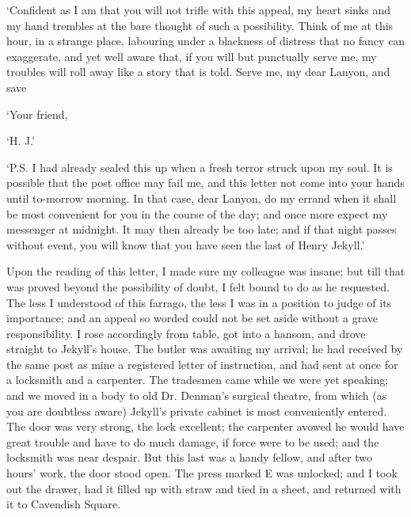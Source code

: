 \documentclass[]{novel}
\begin{document}
\begin{parascale}[0.9]
‘Confident as I am that you will not trifle with this appeal, my heart sinks and my hand trembles at the bare thought of such a possibility. Think of me at this hour, in a strange place, labouring under a blackness of distress that no fancy can exaggerate, and yet well aware that, if you will but punctually serve me, my troubles will roll away like a story that is told. Serve me, my dear Lanyon, and save

\stake\hfill‘Your friend,\hspace{1.5em}

\stake\hfill\textsc{‘H. J.’}\par\null

‘P.S. I had already sealed this up when a fresh terror struck upon my soul. It is possible that the post office may fail me, and this letter not come into your hands until to-morrow morning. In that case, dear Lanyon, do my errand when it shall be most convenient for you in the course of the day; and once more expect my messenger at midnight. It may then already be too late; and if that night passes without event, you will know that you have seen the last of Henry Jekyll.’\par
\vspace{0.097\nbs}
\end{parascale}\par\null

Upon the reading of this letter, I made sure my colleague was insane; but till that was proved beyond the possibility of doubt, I felt bound to do as he requested. The less I understood of this farrago, the less I was in a position to judge of its importance; and an appeal so worded could not be set aside without a grave responsibility. I rose accordingly from table, got into a hansom, and drove straight to Jekyll’s house. The butler was awaiting my arrival; he had received by the same post as mine a registered letter of instruction, and had sent at once for a locksmith and a carpenter. The tradesmen came while we were yet speaking; and we moved in a body to old Dr. Denman’s surgical theatre, from which (as you are doubtless aware) Jekyll’s private cabinet is most conveniently entered. The door was very strong, the lock excellent; the carpenter avowed he would have great trouble and have to do much damage, if force were to be used; and the locksmith was near despair. But this last was a handy fellow, and after two hours’ work, the door stood open. The press marked E was unlocked; and I took out the drawer, had it filled up with straw and tied in a sheet, and returned with it to Cavendish Square.
\end{document}

